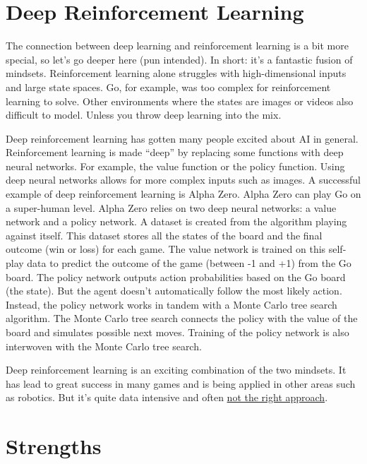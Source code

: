 \documentclass[
  10pt,
]{scrbook}
\begin{document}
\hypertarget{deep-reinforcement-learning}{%
\section{Deep Reinforcement Learning}\label{deep-reinforcement-learning}}

The connection between deep learning and reinforcement learning is a bit more special, so let's go deeper here (pun intended).
In short: it's a fantastic fusion of mindsets.
Reinforcement learning alone struggles with high-dimensional inputs and large state spaces.
Go, for example, was too complex for reinforcement learning to solve.
Other environments where the states are images or videos also difficult to model.
Unless you throw deep learning into the mix.

Deep reinforcement learning has gotten many people excited about AI in general.
Reinforcement learning is made ``deep'' by replacing some functions with deep neural networks.
For example, the value function or the policy function.
Using deep neural networks allows for more complex inputs such as images.
A successful example of deep reinforcement learning is Alpha Zero.
Alpha Zero can play Go on a super-human level.
Alpha Zero relies on two deep neural networks: a value network and a policy network.
A dataset is created from the algorithm playing against itself.
This dataset stores all the states of the board and the final outcome (win or loss) for each game.
The value network is trained on this self-play data to predict the outcome of the game (between -1 and +1) from the Go board.
The policy network outputs action probabilities based on the Go board (the state).
But the agent doesn't automatically follow the most likely action.
Instead, the policy network works in tandem with a Monte Carlo tree search algorithm.
The Monte Carlo tree search connects the policy with the value of the board and simulates possible next moves.
Training of the policy network is also interwoven with the Monte Carlo tree search.

Deep reinforcement learning is an exciting combination of the two mindsets.
It has lead to great success in many games and is being applied in other areas such as robotics.
But it's quite data intensive and often \href{https://www.alexirpan.com/2018/02/14/rl-hard.html}{not the right approach}.

\hypertarget{strengths-8}{%
\section{Strengths}\label{strengths-8}}
\end{document}
